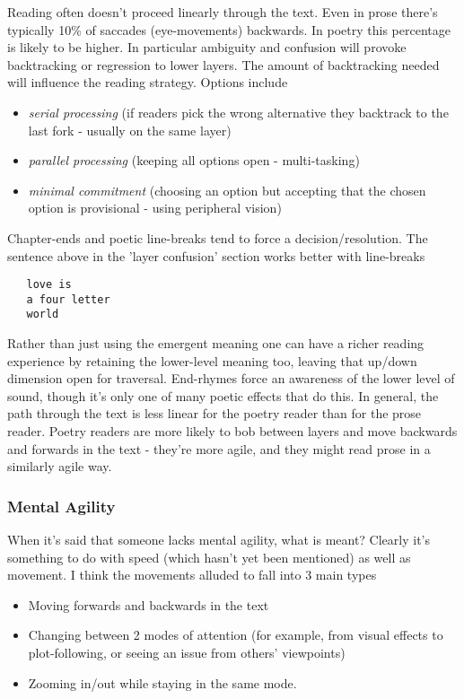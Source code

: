 \documentclass[11pt]{article}
\begin{document}
Reading often doesn't proceed linearly through the text.  Even in prose there's
typically 10\% of saccades (eye-movements) backwards. In poetry this percentage
is likely to be higher. In particular ambiguity and confusion will
provoke backtracking or regression to lower layers. The amount of backtracking needed will influence the
reading strategy. Options include

\begin{itemize}
\item \textit{serial processing} (if readers pick the wrong alternative they
backtrack to the last fork - usually on the same layer)
\item \textit{parallel processing} (keeping all options open - multi-tasking) 
\item \textit{minimal commitment} (choosing an option but accepting that the chosen
  option is provisional - using peripheral vision) 
\end{itemize}

Chapter-ends and poetic line-breaks tend to force a decision/resolution. The
sentence above in the 'layer confusion' section works better with line-breaks

\begin{verbatim}
   love is
   a four letter
   world
\end{verbatim}

Rather than just using the emergent meaning one can have a richer reading 
experience by retaining the lower-level meaning too, leaving that up/down dimension open for traversal.
End-rhymes force an awareness of the lower level of sound, though it's only
one of many poetic effects that do this.
In general, the path through the text is less linear for the poetry reader
than for the prose reader. Poetry readers are more likely to bob between layers
and move backwards and forwards in the text - they're more agile, and they
might read prose in a similarly agile way.


\subsubsection*{Mental Agility}


When it's said that someone lacks mental agility, what is meant? Clearly
it's something to do with speed (which hasn't yet been mentioned) as well as
movement. I think the movements alluded to fall into 3 main types

\begin{itemize}
\item Moving forwards and backwards in the text
\item Changing between 2 modes of attention (for example, from visual effects
to
plot-following, or seeing an issue from others'
viewpoints)
\item Zooming in/out while staying in the same mode.

\end{itemize}
\end{document}
